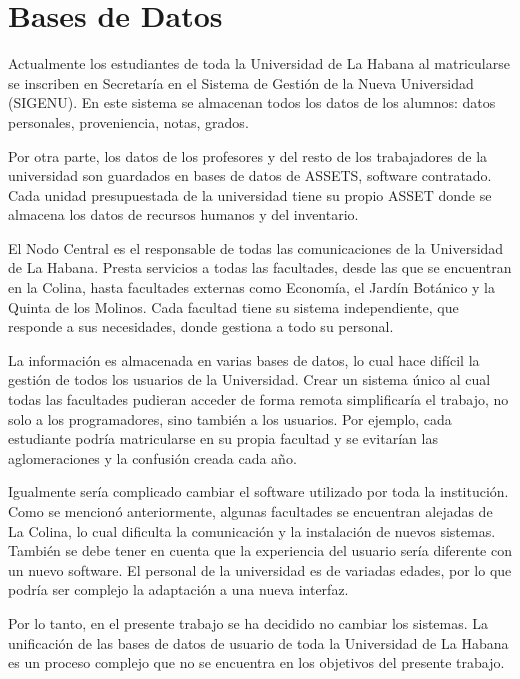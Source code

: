 \section{Bases de Datos} \label{db-layer}

Actualmente los estudiantes de toda la Universidad de La Habana al matricularse se inscriben en Secretaría en el Sistema de Gestión de la Nueva Universidad (SIGENU). En este sistema se almacenan todos los datos de los alumnos: datos personales, proveniencia, notas, grados.

Por otra parte, los datos de los profesores y del resto de los trabajadores de la universidad son guardados en bases de datos de ASSETS, software contratado. Cada unidad presupuestada de la universidad tiene su propio ASSET donde se almacena los datos de recursos humanos y del inventario.

El Nodo Central es el responsable de todas las comunicaciones de la Universidad de La Habana. Presta servicios a todas las facultades, desde las que se encuentran en la Colina, hasta facultades externas como Economía, el Jardín Botánico y la Quinta de los Molinos. Cada facultad tiene su sistema independiente, que responde a sus necesidades, donde gestiona a todo su personal. 

La información es almacenada en varias bases de datos, lo cual hace difícil la gestión de todos los usuarios de la Universidad. Crear un sistema único al cual todas las facultades pudieran acceder de forma remota simplificaría el trabajo, no solo a los programadores, sino también a los usuarios. Por ejemplo, cada estudiante podría matricularse en su propia facultad y se evitarían las aglomeraciones y la confusión creada cada año. 

Igualmente sería complicado cambiar el software utilizado por toda la institución. Como se mencionó anteriormente, algunas facultades se encuentran alejadas de La Colina, lo cual dificulta la comunicación y la instalación de nuevos sistemas. También se debe tener en cuenta que la experiencia del usuario sería diferente con un nuevo software. El personal de la universidad es de variadas edades, por lo que podría ser complejo la adaptación a una nueva interfaz.

Por lo tanto, en el presente trabajo se ha decidido no cambiar los sistemas. La unificación de las bases de datos de usuario de toda la Universidad de La Habana es un proceso complejo que no se encuentra en los objetivos del presente trabajo. 

